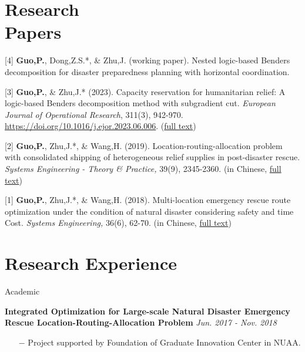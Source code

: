 \documentclass[margin]{res}
\begin{document}
\begin{resume}
\vspace{-.8em}
\section{\sc Research \\Papers}


[4] \textbf{Guo,P.}, Dong,Z.S.*, \& Zhu,J. (working paper). Nested logic-based Benders decomposition for disaster preparedness planning with horizontal coordination.
\vspace{-.8em}

[3] \textbf{Guo,P.}, \& Zhu,J.* (2023). Capacity reservation for humanitarian relief: A logic-based Benders decomposition method with subgradient cut. \textit{European Journal of Operational Research}, 311(3), 942-970. \url{https://doi.org/10.1016/j.ejor.2023.06.006}. (\href{https://guo.ph/publication/CapacityReservationHumanitarian2023.pdf}{full text})
\vspace{-.8em}

[2] \textbf{Guo,P.}, Zhu,J.*, \& Wang,H. (2019). Location-routing-allocation problem with consolidated shipping of heterogeneous relief supplies in post-disaster rescue. \textit{Systems Engineering - Theory \& Practice,} 39(9), 2345-2360. (in Chinese, \href{https://guo.ph/publication/zh-LocationRoutingAllocation.pdf}{full text})
\vspace{-.8em}

[1] \textbf{Guo,P.}, Zhu,J.*, \& Wang,H. (2018). Multi-location emergency rescue route optimization under the condition of natural disaster considering safety and time Cost. \textit{Systems Engineering,} 36(6), 62-70. (in Chinese, \href{https://guo.ph/publication/zh-RiskTime.pdf}{full text})

\vspace{-.8em}
\section{\sc Research Experience}


{\sc Academic}
\vspace{-.8em}

\textbf{{Integrated Optimization for Large-scale Natural Disaster Emergency Rescue Location-Routing-Allocation Problem}} \hspace{65pt} {\it Jun. 2017 - Nov. 2018}
\begin{itemize} \itemsep -2pt  %
\item[\(-\)] Project supported by {Foundation of Graduate Innovation Center in NUAA}.
\end{itemize}



\end{resume}
\end{document}
